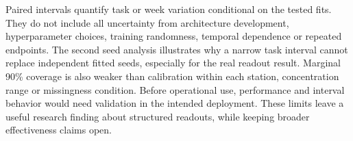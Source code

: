 Paired intervals quantify task or week variation conditional on the tested fits. They do not include all uncertainty from architecture development, hyperparameter choices, training randomness, temporal dependence or repeated endpoints. The second seed analysis illustrates why a narrow task interval cannot replace independent fitted seeds, especially for the real readout result. Marginal 90\% coverage is also weaker than calibration within each station, concentration range or missingness condition. Before operational use, performance and interval behavior would need validation in the intended deployment. These limits leave a useful research finding about structured readouts, while keeping broader effectiveness claims open.
